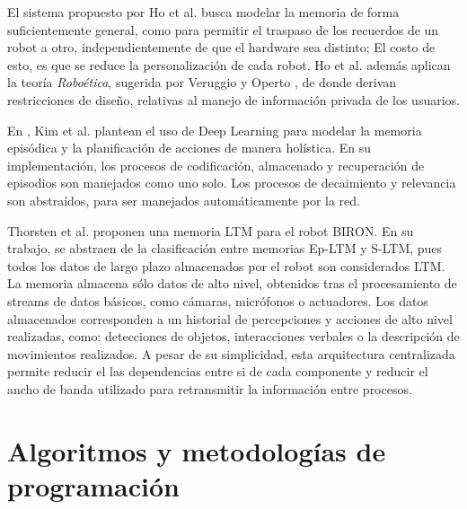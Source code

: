 El sistema propuesto por Ho et al. \cite{Ho2009} busca modelar la memoria de forma suficientemente general, como para permitir el traspaso de los recuerdos de un robot a otro, independientemente de que el hardware sea distinto; El costo de esto, es que se reduce la personalización de cada robot. Ho et al. además aplican la teoría \textit{Roboética}, sugerida por Veruggio y Operto \cite{Veruggio2006}, de donde derivan restricciones de diseño, relativas al manejo de información privada de los usuarios.

En \cite{KimMinJoo2016}, Kim et al. plantean el uso de Deep Learning para modelar la memoria episódica y la planificación de acciones de manera holística. En su implementación, los procesos de codificación, almacenado y recuperación de episodios son manejados como uno solo. Los procesos de decaimiento y relevancia son abstraídos, para ser manejados automáticamente por la red.

Thorsten et al. \cite{Spexard2008} proponen una memoria LTM para el robot BIRON. En su trabajo, se abstraen de la clasificación entre memorias Ep-LTM y S-LTM, pues todos los datos de largo plazo almacenados por el robot son considerados LTM. La memoria almacena sólo datos de alto nivel, obtenidos tras el procesamiento de streams de datos básicos, como cámaras, micrófonos o actuadores. Los datos almacenados corresponden a un historial de percepciones y acciones de alto nivel realizadas, como: detecciones de objetos, interacciones verbales o la descripción de movimientos realizados. A pesar de su simplicidad, esta arquitectura centralizada permite reducir el las dependencias entre si de cada componente y reducir el ancho de banda utilizado para retransmitir la información entre procesos.






\section{Algoritmos y metodologías de programación}


